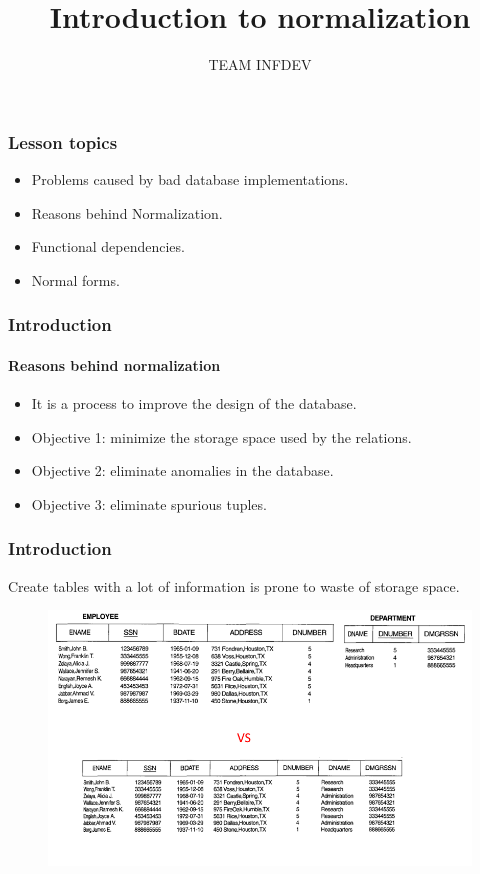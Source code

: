 \documentclass{beamer}
\title{Introduction to normalization}
\author{TEAM INFDEV}
\institute{Hogeschool Rotterdam \\ 
	Rotterdam, Netherlands}
\date{}
\begin{document}
\maketitle


\begin{frame}
	\frametitle{Lesson topics}
	\begin{itemize}
		\item Problems caused by bad database implementations.
		\item Reasons behind Normalization.
		\item Functional dependencies.
		\item Normal forms.
	\end{itemize}
\end{frame}


\begin{frame}
	\frametitle{Introduction}
	\framesubtitle{Reasons behind normalization}
	\begin{itemize}
		\item It is a process to improve the design of the database.
		\item Objective 1: minimize the storage space used by the relations.
		\pause
		\item Objective 2: eliminate anomalies in the database.
		\pause
		\item Objective 3: eliminate spurious tuples.
		\pause
	\end{itemize}
\end{frame}

\begin{frame}
	\frametitle{Introduction}
	Create tables with a lot of information is prone to waste of storage space.

	\begin{figure}
		\includegraphics[scale=0.4]{img/normalization/norm1}
	\end{figure}
\end{frame}
\end{document}
